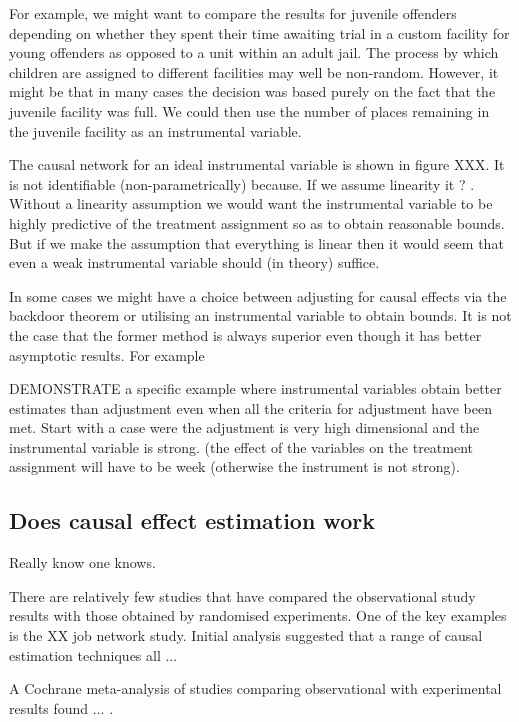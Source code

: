 For example, we might want to compare the results for juvenile offenders depending on whether they spent their time awaiting trial in a custom facility for young offenders as opposed to a unit within an adult jail. The process by which children are assigned to different facilities may well be non-random. However, it might be that in many cases the decision was based purely on the fact that the juvenile facility was full. We could then use the number of places remaining in the juvenile facility as an instrumental variable. 

The causal network for an ideal instrumental variable is shown in figure XXX. It is not identifiable (non-parametrically) because. If we assume linearity it ? . Without a linearity assumption we would want the instrumental variable to be highly predictive of the treatment assignment so as to obtain reasonable bounds. But if we make the assumption that everything is linear then it would seem that even a weak instrumental variable should (in theory) suffice. 

In some cases we might have a choice between adjusting for causal effects via the backdoor theorem or utilising an instrumental variable to obtain bounds. It is not the case that the former method is always superior even though it has better asymptotic results. For example 

DEMONSTRATE a specific example where instrumental variables obtain better estimates than adjustment even when all the criteria for adjustment have been met. Start with a case were the adjustment is very high dimensional and the instrumental variable is strong. (the effect of the variables on the treatment assignment will have to be week (otherwise the instrument is not strong). 


\subsection{Does causal effect estimation work}
Really know one knows.

There are relatively few studies that have compared the observational study results with those obtained by randomised experiments. One of the key examples is the XX job network study. Initial analysis suggested that a range of causal estimation techniques all ...

A Cochrane meta-analysis of studies comparing observational with experimental results found ... \citep{Anglemyer2014}.

